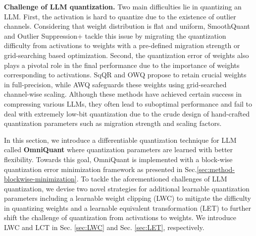 \documentclass{article} %
\begin{document}
\textbf{Challenge of LLM quantization.} Two main difficulties lie in quantizing an LLM. First, the activation is hard to quantize due to the existence of outlier channels.  Considering that weight distribution is flat and uniform, SmoothQuant \citep{smoothquant} and Outlier Suppression+ \citep{outlier-plus} tackle this issue by migrating the quantization difficulty from activations to weights with a pre-defined migration strength or grid-searching based optimization. Second, the quantization error of weights also plays a pivotal role in the final performance due to the importance of weights corresponding to activations. SqQR \citep{spqr} and OWQ \citep{owq} propose to retain crucial weights in full-precision, while AWQ \citep{awq} safeguards these weights using grid-searched channel-wise scaling.  Although these methods have achieved certain success in compressing various LLMs, they often lead to suboptimal performance and fail to deal with extremely low-bit quantization due to the crude design of hand-crafted quantization parameters such as migration strength and scaling factors.
%

In this section, we introduce a differentiable quantization technique for LLM called \textbf{OmniQuant} where quantization parameters are learned with better flexibility. Towards this goal, OmniQuant is implemented with a block-wise quantization error minimization framework as presented in Sec.\ref{sec:method-blockwise-minimization}. To tackle the aforementioned challenges of LLM quantization, we devise two novel strategies for additional learnable quantization parameters including a learnable weight clipping (LWC) to mitigate the difficulty in quantizing weights and a learnable equivalent transformation (LET) to further shift the challenge of quantization from activations to weights. We introduce LWC and LCT in Sec. \ref{sec:LWC} and Sec. \ref{sec:LET}, respectively.
\end{document}

